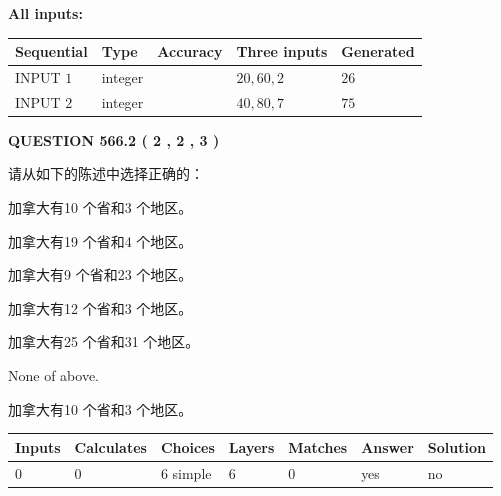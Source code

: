 \documentclass{ctexart}
\begin{document}
   
   
   
\noindent\vspace{0.1in}\hspace{-0.08in} {\textbf{\Large{All inputs: }}}
   
   
  
  
\noindent\begin{tabular}{|l|l|l|l|l|}
\hline
 Sequential & Type & Accuracy & Three inputs & Generated \\ 
\hline
 
 
  INPUT $  1 $ & integer &  & $
 20
 , 
 60
 , 
 2
 $ & $ 26 $ 
 \\  \hline  
 
 
  INPUT $  2 $ & integer &  & $
 40
 , 
 80
 , 
 7
 $ & $ 75 $ 
 \\  \hline  
 \end{tabular}
   
   
  
\vspace{0.2in}
  
{\textbf{\Large{QUESTION
566.2 
 ( 2 , 2 , 3 )
}}}
  
  
请从如下的陈述中选择正确的：
 
 
加拿大有10 个省和3 个地区。
 
 
加拿大有19 个省和4 个地区。
 
 
加拿大有9 个省和23 个地区。
 
 
加拿大有12 个省和3 个地区。
 
 
加拿大有25 个省和31 个地区。
 
 
 None of above.
 
 
\noindent{}
 
 
加拿大有10 个省和3 个地区。
 
 
\noindent{}
 
 
   
   
   
   
\noindent\begin{tabular}{|l|l|l|l|l|l|l|}
 \hline
Inputs & Calculates & Choices & Layers & Matches & Answer & Solution \\ \hline
 0  & 
 0  & 
 6
  simple  
  & 
 6  & 
 0  & 
  yes & 
  no 
  \\ \hline
 \end{tabular}
   
\end{document}
